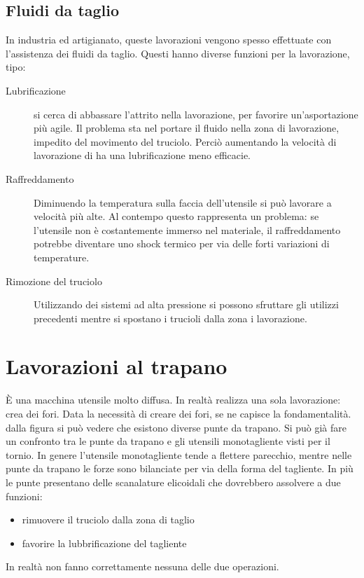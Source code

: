 \subsection{Fluidi da taglio}
In industria ed artigianato, queste lavorazioni vengono spesso
effettuate con l'assistenza dei fluidi da taglio.
Questi hanno diverse funzioni per la lavorazione, tipo:

\begin{description}
\item[Lubrificazione] si cerca di abbassare l'attrito nella
lavorazione, per favorire un'asportazione più agile.
Il problema sta nel portare il fluido nella zona di lavorazione,
impedito del movimento del truciolo.
Perciò aumentando la velocità di lavorazione di ha una 
lubrificazione meno efficacie.
\item[Raffreddamento] Diminuendo la temperatura sulla faccia 
dell'utensile si può lavorare a velocità più alte.
Al contempo questo rappresenta un problema: se l'utensile non è 
costantemente immerso nel materiale, il raffreddamento potrebbe
diventare uno shock termico per via delle forti variazioni di 
temperature.
\item[Rimozione del truciolo] Utilizzando dei sistemi ad alta
pressione si possono sfruttare gli utilizzi precedenti mentre 
si spostano i trucioli dalla zona i lavorazione.
\end{description}

\newpage
\section{Lavorazioni al trapano}
È una macchina utensile molto diffusa.
In realtà realizza una sola lavorazione: crea dei fori.
Data la necessità di creare dei fori, se ne capisce la fondamentalità.
dalla figura si può vedere che esistono diverse punte da trapano.
Si può già fare un confronto tra le punte da trapano e gli utensili
monotagliente visti per il tornio.
In genere l'utensile monotagliente tende a flettere parecchio, mentre nelle punte da trapano 
le forze sono bilanciate per via della forma del tagliente.
In più le punte presentano delle scanalature elicoidali che dovrebbero assolvere
a due funzioni:
\begin{itemize}
\item rimuovere il truciolo dalla zona di taglio
\item favorire la lubbrificazione del tagliente
\end{itemize}
In realtà non fanno correttamente nessuna delle due operazioni.

